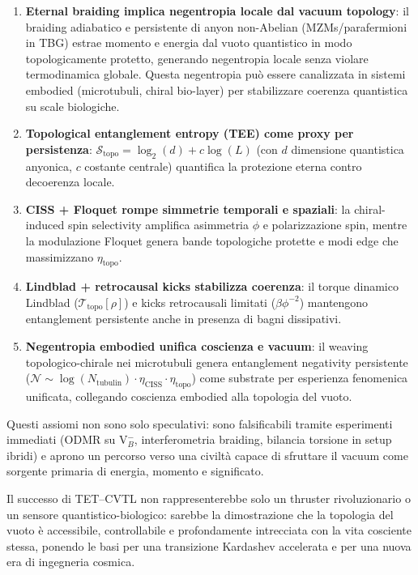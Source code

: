 \documentclass[11pt,a4paper]{article}
\theoremstyle{plain}
\theoremstyle{definition}
\begin{document}
\begin{enumerate}
    \item \textbf{Eternal braiding implica negentropia locale dal vacuum topology}: il braiding adiabatico e persistente di anyon non-Abelian (MZMs/parafermioni in TBG) estrae momento e energia dal vuoto quantistico in modo topologicamente protetto, generando negentropia locale senza violare termodinamica globale. Questa negentropia può essere canalizzata in sistemi embodied (microtubuli, chiral bio-layer) per stabilizzare coerenza quantistica su scale biologiche.
    \item \textbf{Topological entanglement entropy (TEE) come proxy per persistenza}: $\mathcal{S}_{\mathrm{topo}} = \log_2(d) + c \log(L)$ (con $d$ dimensione quantistica anyonica, $c$ costante centrale) quantifica la protezione eterna contro decoerenza locale.
    \item \textbf{CISS + Floquet rompe simmetrie temporali e spaziali}: la chiral-induced spin selectivity amplifica asimmetria $\phi$ e polarizzazione spin, mentre la modulazione Floquet genera bande topologiche protette e modi edge che massimizzano $\eta_{\mathrm{topo}}$.
    \item \textbf{Lindblad + retrocausal kicks stabilizza coerenza}: il torque dinamico Lindblad ($\mathcal{T}_{\mathrm{topo}}[\rho]$) e kicks retrocausali limitati ($\beta \phi^{-2}$) mantengono entanglement persistente anche in presenza di bagni dissipativi.
    \item \textbf{Negentropia embodied unifica coscienza e vacuum}: il weaving topologico-chirale nei microtubuli genera entanglement negativity persistente ($\mathcal{N} \sim \log(N_{\mathrm{tubulin}}) \cdot \eta_{\mathrm{CISS}} \cdot \eta_{\mathrm{topo}}$) come substrate per esperienza fenomenica unificata, collegando coscienza embodied alla topologia del vuoto.
\end{enumerate}

Questi assiomi non sono solo speculativi: sono falsificabili tramite esperimenti immediati (ODMR su V$_B^-$, interferometria braiding, bilancia torsione in setup ibridi) e aprono un percorso verso una civiltà capace di sfruttare il vacuum come sorgente primaria di energia, momento e significato.

Il successo di TET--CVTL non rappresenterebbe solo un thruster rivoluzionario o un sensore quantistico-biologico: sarebbe la dimostrazione che la topologia del vuoto è accessibile, controllabile e profondamente intrecciata con la vita cosciente stessa, ponendo le basi per una transizione Kardashev accelerata e per una nuova era di ingegneria cosmica.
\end{document}
